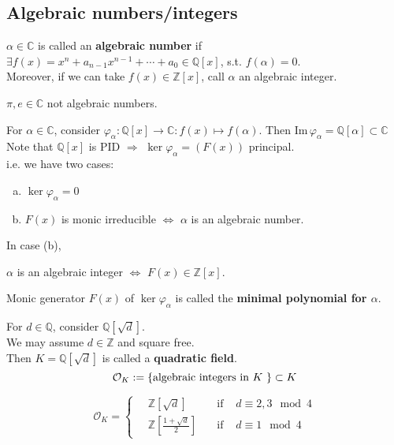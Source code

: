 \subsection{Algebraic numbers/integers}
\begin{definition}
     $ \alpha\in \mathbb{C} $ is called an \textbf{algebraic number} if  $ \exists f(x)=x^n+a_{n-1}x^{n-1}+\cdots+a_0\in\mathbb{Q}[x] $, s.t.  $ f(\alpha)=0 $.\\
     Moreover, if we can take  $ f(x)\in\mathbb{Z} [x]$, call  $ \alpha  $ an algebraic integer.   
\end{definition}
\begin{example}
     $ \pi,e\in\mathbb{C} $ not algebraic numbers.
\end{example}
For  $ \alpha\in \mathbb{C} $, consider  $ \varphi_{\alpha}:\mathbb{Q}[x] \rightarrow \mathbb{C}:f(x)\mapsto f(\alpha)$. Then  $ \mathrm{Im} \,\varphi_\alpha=\mathbb{Q}[\alpha]\subset \mathbb{C} $   \index{$ \varphi_\alpha $}\\
Note that  $ \mathbb{Q}[x] $ is PID $ \Rightarrow $  $\ker \varphi_\alpha =(F(x))$ principal.\\
i.e. we have two cases:
\begin{enumerate}[(a)]
    \item  $ \ker\varphi_\alpha=0 $
    \item  $ F(x) $ is monic irreducible $ \Leftrightarrow $ $ \alpha  $ is an algebraic number.  
\end{enumerate} 
In case (b),\\
\begin{center}
     $ \alpha  $ is an algebraic integer  $ \Leftrightarrow  $  $ F(x)\in \mathbb{Z}[x] $.  
\end{center}
\begin{definition}
    Monic generator  $ F(x)  $ of  $ \ker \varphi_\alpha  $ is called the \textbf{minimal polynomial for  $ \alpha $}.
\end{definition}
For  $ d\in \mathbb{Q} $, consider  $ \mathbb{Q}[\sqrt{d}] $. \\
We may assume  $ d\in \mathbb{Z} $ and square free.\\
Then  $ K=\mathbb{Q}[\sqrt{d}] $ is called a \textbf{quadratic field}.\\
\[\mathcal{O}_K:=\{\text{algebraic integers in  $ K $ }\}\subset K\]  
\begin{proposition}
    \begin{equation*}
        \mathcal{O}_K= \left\{ 
            \begin{aligned}
                \,&\mathbb{Z}\left[\sqrt{d}\right]\quad &\text{if } &d\equiv 2,3\mod 4 \\
                \,&\mathbb{Z}\left[\frac{1+\sqrt{d}}{2}\right]\quad &\text{if } &d\equiv1\mod 4
            \end{aligned}
        \right.
    \end{equation*}
\end{proposition}
